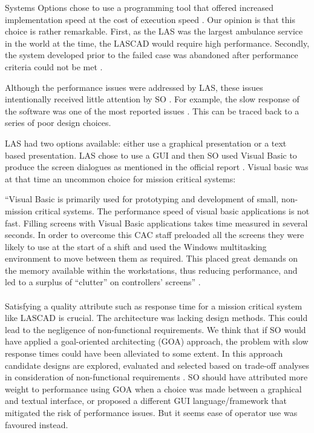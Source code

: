 Systems Options chose to use a programming tool that offered increased implementation speed at the cost of execution speed \cite[s3128]{officialreport}.
Our opinion is that this choice is rather remarkable.
First, as the LAS was the largest ambulance service in the world at the time, the LASCAD would require high performance.
Secondly, the system developed prior to the failed case was abandoned after performance criteria could not be met \cite[s2017]{officialreport}.

Although the performance issues were addressed by LAS, these issues intentionally received little attention by SO \cite[s3128]{officialreport}.
For example, the slow response of the software was one of the most reported issues \cite[s3126]{officialreport}.
This can be traced back to a series of poor design choices.

LAS had two options available: either use a graphical presentation or a text based presentation.
LAS chose to use a GUI and then SO used Visual Basic to produce the screen dialogues as mentioned in the official report \cite[s3128]{officialreport}.
Visual basic was at that time an uncommon choice for mission critical systems: \\

\begin{itshape}
\begin{addmargin}[1em]{1em}
``Visual Basic is primarily used for prototyping and development of small, non-mission critical systems.
The performance speed of visual basic applications is not fast.
Filling screens with Visual Basic applications takes time measured in several seconds.
In order to overcome this CAC staff preloaded all the screens they were likely to use at the start of a shift and used the Windows multitasking environment to move between them as required.
This placed great demands on the memory available within the workstations, thus reducing performance,
and led to a surplus of ``clutter'' on controllers' screens'' \cite[s3128]{officialreport}.
\end{addmargin}
\end{itshape}

\paragraph{}
Satisfying a quality attribute such as response time for a mission critical system like LASCAD is crucial.
The architecture was lacking design methods.
This could lead to the negligence of non-functional requirements.
We think that if SO would have applied a goal-oriented architecting (GOA) approach,
the problem with slow response times could have been alleviated to some extent.
In this approach candidate designs are explored, evaluated and selected based on trade-off analyses in consideration of non-functional requirements \autocite[92]{chung2011goal}.
SO should have attributed more weight to performance using GOA when a choice was made between a graphical and textual interface,
or proposed a different GUI language/framework that mitigated the risk of performance issues.
But it seems ease of operator use was favoured instead.